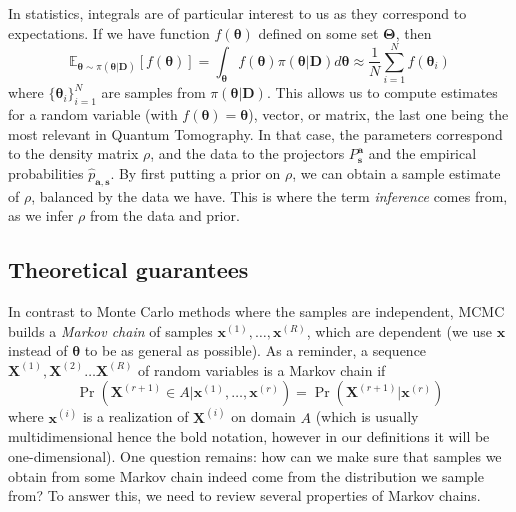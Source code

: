 \documentclass[12pt]{memoir}
\newcommand{\mb}{\mathbf}
\newcommand{\ti}{\textit}
\newcommand{\btheta}{\boldsymbol{\theta}}
\begin{document}
In statistics, integrals are of particular interest to us as they correspond to expectations. If we have function $f(\boldsymbol{\theta})$ defined on some set $\boldsymbol{\Theta}$, then
\begin{equation}
    \mathbb E_{\boldsymbol \theta \sim \pi(\btheta|\mb{D})}\left[f(\boldsymbol{\theta})\right] = \int_{\boldsymbol{\theta}} f(\boldsymbol{\theta})\pi(\btheta|\mb{D}) d\boldsymbol{\btheta} \approx \frac{1}{N} \sum_{i=1}^{N} f(\boldsymbol{\theta}_i)
\end{equation}
where $\{\boldsymbol{\theta}_i\}^N_{i=1}$ are samples from $\pi(\btheta|\mb{D})$. This allows us to compute estimates for a random variable (with $f(\btheta) = \btheta$), vector, or matrix, the last one being the most relevant in Quantum Tomography. In that case, the parameters correspond to the density matrix $\rho$, and the data to the projectors $P^{\mb a}_{\mb s}$ and the empirical probabilities $\hat p_{\mb a,\mb s}$. By first putting a prior on $\rho$, we can obtain a sample estimate of $\rho$, balanced by the data we have. This is where the term \ti{inference} comes from, as we infer $\rho$ from the data and prior.

\subsection{Theoretical guarantees}\label{section:background:mcmc:theory}
In contrast to Monte Carlo methods where the samples are independent, MCMC builds a \ti{Markov chain} of samples $\mb x^{(1)}, \dots, \mb x^{(R)}$, which are dependent (we use $\mb x$ instead of $\btheta$ to be as general as possible). As a reminder, a sequence $\mb X^{(1)}, \mb X^{(2)} \dots \mb X^{(R)}$ of random variables is a Markov chain if
\begin{equation}
    \Pr(\mb X^{(r+1)} \in A|\mb x^{(1)}, \dots, \mb x^{(r)}) = \Pr(\mb X^{(r+1)}|\mb x^{(r)})
\end{equation}
where $\mb x^{(i)}$ is a realization of $\mb X^{(i)}$ on domain $A$ (which is usually multidimensional hence the bold notation, however in our definitions it will be one-dimensional). One question remains: how can we make sure that samples we obtain from some Markov chain indeed come from the distribution we sample from? To answer this, we need to review several properties of Markov chains.\medbreak
\end{document}
